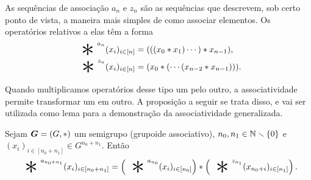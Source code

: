 As sequências de associação $a_n$ e $z_n$ são as sequências que descrevem, sob certo ponto de vista, a maneira mais simples de como associar elementos. Os operatórios relativos a elas têm a forma
	\begin{align*}
	\bigopb\nolimits^{a_n} (x_i)_{i \in [n]} &= (((x_0 \opb x_1) \cdots ) \opb x_{n-1}), \\
	\bigopb\nolimits^{z_n} (x_i)_{i \in [n]} &=  (x_{0} \opb ( \cdots (x_{n-2} \opb x_{n-1}))).
	\end{align*}

Quando multiplicamos operatórios desse tipo um pelo outro, a associatividade permite transformar um em outro. A proposição a seguir se trata disso, e vai ser utilizada como lema para a demonstração da associatividade generalizada.

\begin{proposition}
\label{prop:lema.associatividade.generalizada}
Sejam $\bm G=(G,\ast)$ um semigrupo (grupoide associativo), $n_0,n_1 \in \mathbb{N} \smallsetminus \{0\}$ e $(x_i)_{i \in [n_0+n_1]} \in G^{n_0+n_1}$. Então
	\begin{equation*}
	\bigopb\nolimits^{a_{n_0+n_1}} (x_i)_{i \in [n_0+n_1]} = \left( \bigopb\nolimits^{a_{n_0}} (x_i)_{i \in [n_0]} \right) \opb \left( \bigopb\nolimits^{z_{n_1}} (x_{n_0+i})_{i \in [n_1]} \right).
	\end{equation*}
\end{proposition}
